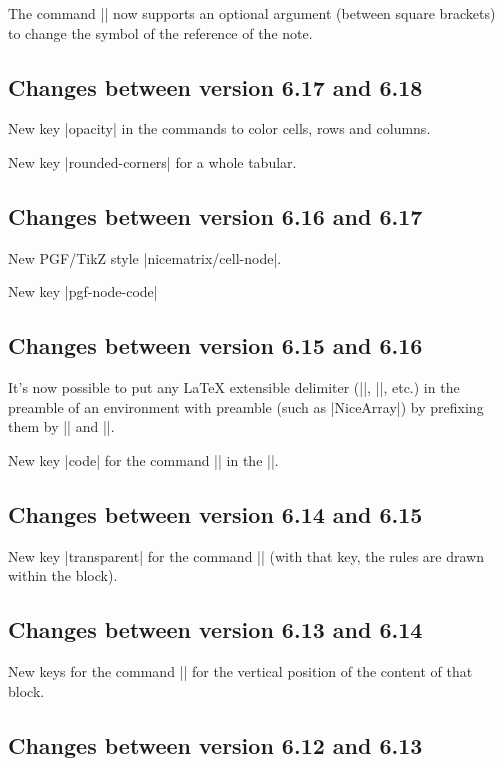 \documentclass[dvipsnames]{article}%
\begin{document}
The command |\tabularnote| now supports an optional argument (between square
brackets) to change the symbol of the reference of the note.

\subsection*{Changes between version 6.17 and 6.18}

New key |opacity| in the commands to color cells, rows and columns.

New key |rounded-corners| for a whole tabular.


\subsection*{Changes between version 6.16 and 6.17}

New PGF/TikZ style |nicematrix/cell-node|.

New key |pgf-node-code|

\subsection*{Changes between version 6.15 and 6.16}

It's now possible to put any LaTeX extensible delimiter (|\lgroup|, |\langle|,
etc.) in the preamble of an environment with preamble (such as |{NiceArray}|)
by prefixing them by |\left| and |\right|.

New key |code| for the command |\SubMatrix| in the |\CodeAfter|.

\subsection*{Changes between version 6.14 and 6.15}

New key |transparent| for the command |\Block| (with that key, the rules are
drawn within the block).

\subsection*{Changes between version 6.13 and 6.14}

New keys for the command |\Block| for the vertical position of the content of
that block.

\subsection*{Changes between version 6.12 and 6.13}
\end{document}
